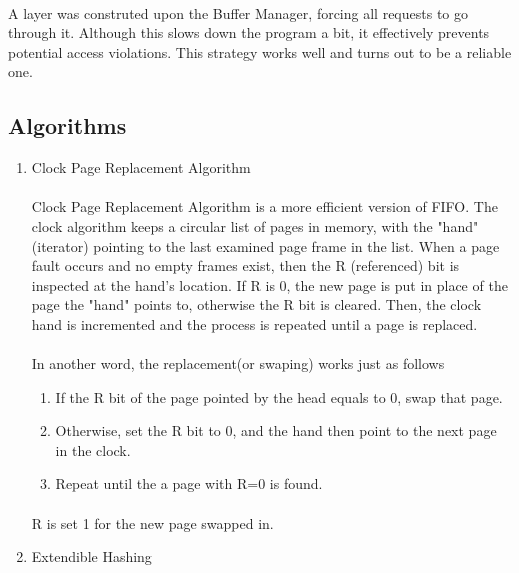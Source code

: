 \documentclass[a4paper, 12pt]{article}
\begin{document}
        \paragraph{}
            A layer was construted upon the Buffer Manager, forcing all requests to go through it. Although this slows down the program a bit, it effectively prevents potential access violations. This strategy works well and turns out to be a reliable one.
    \subsection{Algorithms}
        \begin{enumerate}
            \item Clock Page Replacement Algorithm
                \paragraph{}
                    Clock Page Replacement Algorithm is a more efficient version of FIFO. The clock algorithm keeps a circular list of pages in memory, with the "hand" (iterator) pointing to the last examined page frame in the list. When a page fault occurs and no empty frames exist, then the R (referenced) bit is inspected at the hand's location. If R is 0, the new page is put in place of the page the "hand" points to, otherwise the R bit is cleared. Then, the clock hand is incremented and the process is repeated until a page is replaced.
                \paragraph{}
                    In another word, the replacement(or swaping) works just as follows
                    \begin{enumerate}
                        \item If the R bit of the page pointed by the head equals to 0, swap that page.
                        \item Otherwise, set the R bit to 0, and the hand then point to the next page in the clock.
                        \item Repeat until the a page with R=0 is found.
                    \end{enumerate}
                \paragraph{}
                    R is set 1 for the new page swapped in.
            \item Extendible Hashing

\end{enumerate}
\end{document}
